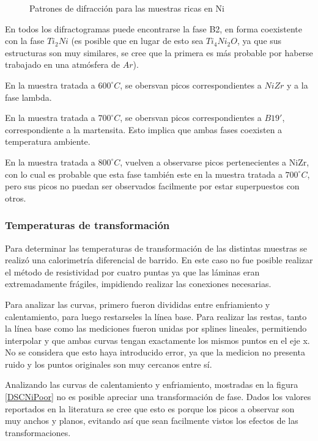 \documentclass[12pt]{article}
\theoremstyle{definition}
\theoremstyle{remark}
\begin{document}
\begin{figure}[h]
\caption{Patrones de difracción para las muestras ricas en Ni}
\label{RXNiPoor}
\end{figure}


En todos los difractogramas puede encontrarse la fase B2, en forma coexistente con la fase $Ti_2Ni$ (es posible que en lugar de esto sea $Ti_4Ni_2O$, ya que sus estructuras son muy similares, se cree que la primera es más probable por haberse trabajado en una atmósfera de $Ar$).

En la muestra tratada a $600 ^\circ C$, se obersvan picos correspondientes a $NiZr$ y a la fase lambda.

En la muestra tratada a $700 ^\circ C$, se obersvan picos correspondientes a $B19'$, correspondiente a la martensita. Esto implica que ambas fases coexisten a temperatura ambiente.

En la muestra tratada a $800 ^\circ C$, vuelven a observarse picos pertenecientes a NiZr, con lo cual es probable que esta fase también este en la muestra tratada a $700 ^\circ C$, pero sus picos no puedan ser observados facilmente por estar superpuestos con otros.

\subsubsection{Temperaturas de transformación}
Para determinar las temperaturas de transformación de las distintas muestras se realizó una calorimetría diferencial de barrido. En este caso no fue posible realizar el método de resistividad por cuatro puntas ya que las láminas eran extremadamente frágiles, impidiendo realizar las conexiones necesarias.

Para analizar las curvas, primero fueron divididas entre enfriamiento y calentamiento, para luego restarseles la línea base. Para realizar las restas, tanto la línea base como las mediciones fueron unidas por splines lineales, permitiendo interpolar y que ambas curvas tengan exactamente los mismos puntos en el eje x. No se considera que esto haya introducido error, ya que la medicion no presenta ruido y los puntos originales son muy cercanos entre sí.

Analizando las curvas de calentamiento y enfriamiento, mostradas en la figura \ref{DSCNiPoor} no es posible apreciar una transformación de fase. Dados los valores reportados en la literatura  se cree que esto es porque los picos a observar son muy anchos y planos, evitando así que sean facilmente vistos los efectos de las transformaciones.
\end{document}
